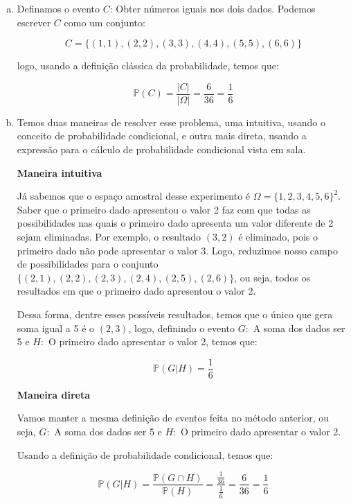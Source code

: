 \documentclass[12pt]{article}
\begin{document}
\begin{enumerate}[a)]
    Perceba que obtivemos o mesmo valor das duas maneiras. Atente-se para o fato que em muitos cenários práticos em que o espaço amostral é muito grande, a abordagem intuitiva pode ser trabalhosa. 

    \item Definamos o evento $C$: Obter números iguais nos dois dados. Podemos escrever $C$ como um conjunto:
    
    $$C = \{(1,1), (2,2), (3,3), (4,4), (5,5), (6,6)\}$$

    logo, usando a definição clássica da probabilidade, temos que:

    $$\mathds{P}(C) = \dfrac{|C|}{|\Omega|} = \dfrac{6}{36} = \dfrac{1}{6}$$
    \item
    
    Temos duas maneiras de resolver esse problema, uma intuitiva, usando o conceito de probabilidade condicional, e outra mais direta, usando a expressão para o cálculo 
    de probabilidade condicional vista em sala. 

    \textbf{Maneira intuitiva}

    Já sabemos que o espaço amostral desse experimento é $\Omega = \{1,2,3,4,5,6\}^2$. Saber que o primeiro dado apresentou o valor 2 faz com que todas as possibilidades nas quais 
    o primeiro dado apresenta um valor diferente de 2 sejam eliminadas. Por exemplo, o resultado $(3,2)$ é eliminado, pois o primeiro dado não pode apresentar o valor 3. Logo, 
 reduzimos nosso campo de possibilidades para o conjunto $\{(2,1), (2,2), (2,3), (2,4), (2,5), (2,6)\}$, ou seja, todos os resultados
    em que o primeiro dado apresentou o valor 2. 

    Dessa forma, dentre esses possíveis resultados, temos que o único que gera soma igual a 5 é o $(2,3)$, logo, definindo o evento $G:$ A soma dos dados ser 5 e $H:$ O primeiro dado apresentar o valor 2, temos que: 

   $$\mathds{P}(G|H) = \dfrac{1}{6}$$

    \textbf{Maneira direta}

    Vamos manter a mesma definição de eventos feita no método anterior, ou seja, $G:$ A soma dos dados ser 5 e $H:$ O primeiro dado apresentar o valor 2.

    Usando a definição de probabilidade condicional, temos que:

    $$\mathds{P}(G|H) = \dfrac{\mathds{P}(G \cap H)}{\mathds{P}(H)} = \dfrac{\frac{1}{36}}{\frac{1}{6}} = \dfrac{6}{36} = \dfrac{1}{6}$$


\end{enumerate}
\end{document}
